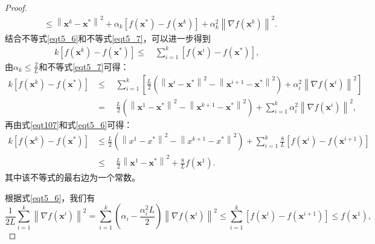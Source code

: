 \begin{proof}
\begin{equation}
\begin{split}
        &\leq\left\|\bm{x}^{k}-\bm{x}^{*}\right\|^{2}+\alpha_{k}\left[f\left(\bm{x}^{*}\right)-f\left(\bm{x}^{k}\right)\right]+\alpha_{k}^{2}\left\|\nabla f\left(\bm{x}^{k}\right)\right\|^{2} .
        \end{split}
        \label{eqt5_7}
    \end{equation}
    结合不等式\ref{eqt5_6}和不等式\ref{eqt5_7}，可以进一步得到
    \begin{equation}
        \begin{split}
        k\left[f\left(\bm{x}^{k}\right)-f\left(\bm{x}^{*}\right)\right]
        \leq \quad \sum_{i=1}^{k}\left[f\left(\bm{x}^{i}\right)-f\left(\bm{x}^{*}\right)\right] ,
        \end{split}
        \nonumber
    \end{equation}
    由$\alpha_{k} \leq \frac{2}{L}$和不等式\ref{eqt5_7}可得：
    \begin{equation}
        \begin{split}
        k\left[f\left(\bm{x}^{k}\right)-f\left(\bm{x}^{*}\right)\right] &\leq \quad \sum_{i=1}^{k}\left[\frac{L}{2}\left(\left\|\bm{x}^{i}-\bm{x}^{*}\right\|^{2}-\left\|\bm{x}^{i+1}-\bm{x}^{*}\right\|^{2}\right)+\alpha_{i}^{2}\left\|\nabla f\left(\bm{x}^{i}\right)\right\|^{2}\right] \\
        &=\quad \frac{L}{2}\left(\left\|\bm{x}^{1}-\bm{x}^{*}\right\|^{2}-\left\|\bm{x}^{k+1}-\bm{x}^{*}\right\|^{2}\right)+\sum_{i=1}^{k} \alpha_{i}^{2}\left\|\nabla f\left(\bm{x}^{i}\right)\right\|^{2} ,
        \nonumber
        \end{split}
    \end{equation}
    再由式\ref{eqt107}和式\ref{eqt5_6}可得：
    \begin{equation}
        \begin{split}
        k\left[f\left(\bm{x}^{k}\right)-f\left(\bm{x}^{*}\right)\right]  &\leq \frac{L}{2}\left(\left\|x^{1}-x^{*}\right\|^{2}-\left\|x^{k+1}-x^{*}\right\|^{2}\right)+\sum_{i=1}^{k} \frac{8}{L}\left[f\left(\bm{x}^{i}\right)-f\left(\bm{x}^{i+1}\right)\right]\\
        & \leq \quad \frac{L}{2}\left\|\bm{x}^{1}-\bm{x}^{*}\right\|^{2}+\frac{8}{L} f\left(\bm{x}^{1}\right) .
        \label{eqt5_8}
        \end{split}
    \end{equation}
    其中该不等式的最右边为一个常数。
\par 根据式\ref{eqt5_6}，我们有
    \begin{equation}
        \frac{1}{2 L} \sum_{i=1}^{k}\left\|\nabla f\left(\bm{x}^{i}\right)\right\|^{2}=\sum_{i=1}^{k}\left(\alpha_{i}-\frac{\alpha_{i}^{2} L}{2}\right)\left\|\nabla f\left(\bm{x}^{i}\right)\right\|^{2} \leq \sum_{i=1}^{k}\left[f\left(\bm{x}^{i}\right)-f\left(\bm{x}^{i+1}\right)\right] \leq f\left(\bm{x}^{1}\right) ,

\end{equation}
\end{proof}
